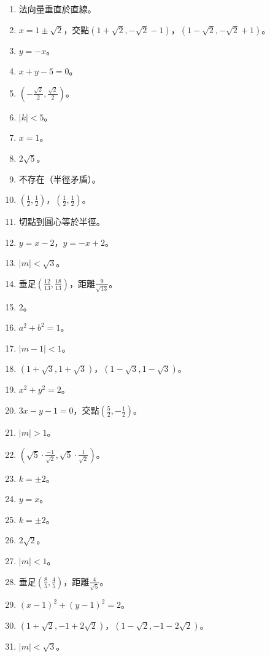 \begin{enumerate}[label=\arabic*.]
    \item 法向量垂直於直線。
    \item $x = 1 \pm \sqrt{2}$，交點$\left(1 + \sqrt{2}, -\sqrt{2} - 1\right)$，$\left(1 - \sqrt{2}, -\sqrt{2} + 1\right)$。
    \item $y = -x$。
    \item $x + y - 5 = 0$。
    \item $\left(-\frac{\sqrt{2}}{2}, \frac{\sqrt{2}}{2}\right)$。
    \item $|k| < 5$。
    \item $x = 1$。
    \item $2\sqrt{5}$。
    \item 不存在（半徑矛盾）。
    \item $\left(\frac{1}{2}, \frac{1}{2}\right)$，$\left(\frac{1}{2}, \frac{1}{2}\right)$。
    \item 切點到圓心等於半徑。
    \item $y = x - 2$，$y = -x + 2$。
    \item $|m| < \sqrt{3}$。
    \item 垂足$\left(\frac{12}{13}, \frac{18}{13}\right)$，距離$\frac{9}{\sqrt{13}}$。
    \item $2$。
    \item $a^2 + b^2 = 1$。
    \item $|m - 1| < 1$。
    \item $(1 + \sqrt{3}, 1 + \sqrt{3})$，$(1 - \sqrt{3}, 1 - \sqrt{3})$。
    \item $x^2 + y^2 = 2$。
    \item $3x - y - 1 = 0$，交點$\left(\frac{5}{2}, -\frac{1}{2}\right)$。
    \item $|m| > 1$。
    \item $\left(\sqrt{5} \cdot \frac{-1}{\sqrt{2}}, \sqrt{5} \cdot \frac{1}{\sqrt{2}}\right)$。
    \item $k = \pm 2$。
    \item $y = x$。
    \item $k = \pm 2$。
    \item $2\sqrt{2}$。
    \item $|m| < 1$。
    \item 垂足$\left(\frac{8}{5}, \frac{4}{5}\right)$，距離$\frac{4}{\sqrt{5}}$。
    \item $(x - 1)^2 + (y - 1)^2 = 2$。
    \item $(1 + \sqrt{2}, -1 + 2\sqrt{2})$，$(1 - \sqrt{2}, -1 - 2\sqrt{2})$。
    \item $|m| < \sqrt{3}$。
\end{enumerate}

